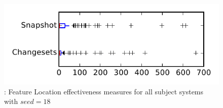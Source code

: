 
\begin{figure}
\centering
\includegraphics[height=0.4\textheight]{figures/flt_seed/rq1_tiny_18}
\caption{\rone: Feature Location effectiveness measures for all subject systems with $seed=18$}
\label{fig:flt_seed:rq1:tiny}
\end{figure}
